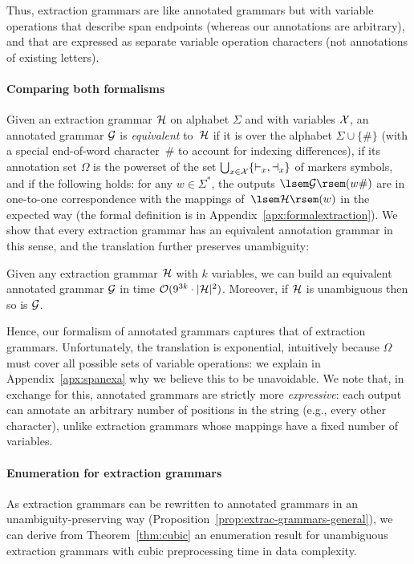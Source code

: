 %
%
%
%
%
%
%
%
%
%
%
%
%
%
%
%
%
%
%
%
%
%
%
%
%
%
%
%
%
%
%
%
%
%
%
%
%
%
%
%
%
%
%
%
%
%
%
%
%
%

Thus, extraction grammars are like annotated grammars but with variable
operations that
describe span endpoints
(whereas our annotations are arbitrary), and that are expressed as separate
variable operation characters (not annotations of existing letters).
%

\paragraph{Comparing both formalisms}
Given an extraction grammar $\mathcal{H}$ on alphabet $\Sigma$ and with variables
$\mathcal{X}$, an annotated  grammar $\mathcal{G}$ is \emph{equivalent} to~$\mathcal{H}$ if it is over the
alphabet $\Sigma \cup \{\#\}$ 
(with a special end-of-word character~$\#$ to account for indexing differences),
if its annotation set $\Omega$
is the powerset of the set $\bigcup_{x \in \mathcal{X}} \{\vdash_x, \dashv_x\}$ of
markers symbols, and if the following holds:
for any $w \in \Sigma^*$, the outputs $\sem{\cG}(w \#)$ are in
one-to-one correspondence with the mappings of~$\sem{\cH}(w)$ in the expected
way (the formal definition is in Appendix~\ref{apx:formalextraction}).
We show that every extraction grammar has an equivalent annotation grammar
in this sense, and the translation further preserves unambiguity:

%

\begin{proposition}\label{prop:extrac-grammars-general}
  Given any extraction grammar $\mathcal{H}$ with $k$ variables, we can build an
  equivalent annotated grammar $\mathcal{G}$ in time $\mathcal{O}(9^{3k}\cdot|\mathcal{H}|^2)$. Moreover, if $\mathcal{H}$ is unambiguous then so is $\mathcal{G}$.
\end{proposition}

Hence, our formalism of annotated grammars captures that of extraction grammars.
%
Unfortunately, the translation is exponential, 
intuitively because $\Omega$ must cover all possible sets of variable operations: we
explain in Appendix~\ref{apx:spanexa} why we believe this to be unavoidable.
We note that, in exchange for this, annotated grammars
are strictly more \emph{expressive}: each output can annotate an arbitrary
number of positions in the string (e.g., every other character), unlike
extraction grammars whose mappings have a fixed number of variables.

\paragraph{Enumeration for extraction grammars}
As extraction grammars can be rewritten to annotated grammars in an unambiguity-preserving way (Proposition~\ref{prop:extrac-grammars-general}), we can derive from
Theorem~\ref{thm:cubic} an enumeration result for unambiguous extraction grammars with cubic preprocessing time in data complexity.

